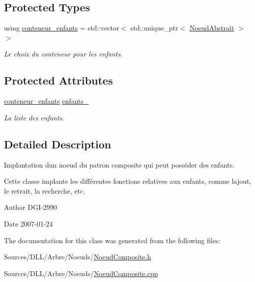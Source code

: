 \subsection*{Protected Types}
\begin{DoxyCompactItemize}
\item 
\hypertarget{class_noeud_composite_ac12bde5084b853e81fa3f7560e8ffeaf}{}using \hyperlink{class_noeud_composite_ac12bde5084b853e81fa3f7560e8ffeaf}{conteneur\+\_\+enfants} = std\+::vector$<$ std\+::unique\+\_\+ptr$<$ \hyperlink{class_noeud_abstrait}{Noeud\+Abstrait} $>$$>$\label{class_noeud_composite_ac12bde5084b853e81fa3f7560e8ffeaf}

\begin{DoxyCompactList}\small\item\em Le choix du conteneur pour les enfants. \end{DoxyCompactList}\end{DoxyCompactItemize}
\subsection*{Protected Attributes}
\begin{DoxyCompactItemize}
\item 
\hypertarget{class_noeud_composite_a628227fd324020e497ada7577457ff3f}{}\hyperlink{class_noeud_composite_ac12bde5084b853e81fa3f7560e8ffeaf}{conteneur\+\_\+enfants} \hyperlink{class_noeud_composite_a628227fd324020e497ada7577457ff3f}{enfants\+\_\+}\label{class_noeud_composite_a628227fd324020e497ada7577457ff3f}

\begin{DoxyCompactList}\small\item\em La liste des enfants. \end{DoxyCompactList}\end{DoxyCompactItemize}


\subsection{Detailed Description}
Implantation d\textquotesingle{}un noeud du patron composite qui peut posséder des enfants. 

Cette classe implante les différentes fonctions relatives aux enfants, comme l\textquotesingle{}ajout, le retrait, la recherche, etc.

\begin{DoxyAuthor}{Author}
D\+G\+I-\/2990 
\end{DoxyAuthor}
\begin{DoxyDate}{Date}
2007-\/01-\/24 
\end{DoxyDate}


The documentation for this class was generated from the following files\+:\begin{DoxyCompactItemize}
\item 
Sources/\+D\+L\+L/\+Arbre/\+Noeuds/\hyperlink{_noeud_composite_8h}{Noeud\+Composite.\+h}\item 
Sources/\+D\+L\+L/\+Arbre/\+Noeuds/\hyperlink{_noeud_composite_8cpp}{Noeud\+Composite.\+cpp}\end{DoxyCompactItemize}
